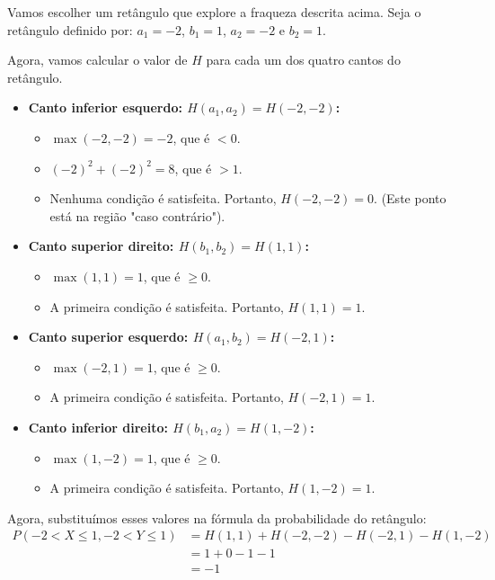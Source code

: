 \documentclass[12pt]{article}
\begin{document}
Vamos escolher um retângulo que explore a fraqueza descrita acima.
Seja o retângulo definido por: $a_1 = -2$, $b_1 = 1$, $a_2 = -2$ e $b_2 = 1$.

Agora, vamos calcular o valor de $H$ para cada um dos quatro cantos do retângulo.

\begin{itemize}
    \item \textbf{Canto inferior esquerdo: $H(a_1, a_2) = H(-2, -2)$:}
    \begin{itemize}
        \item $\max(-2,-2) = -2$, que é $< 0$.
        \item $(-2)^2 + (-2)^2 = 8$, que é $> 1$.
        \item Nenhuma condição é satisfeita. Portanto, \textbf{$H(-2, -2) = 0$}.
        (Este ponto está na região "caso contrário").
    \end{itemize}
    
    \item \textbf{Canto superior direito: $H(b_1, b_2) = H(1, 1)$:}
    \begin{itemize}
        \item $\max(1,1) = 1$, que é $\ge 0$.
        \item A primeira condição é satisfeita. Portanto, \textbf{$H(1, 1) = 1$}.
    \end{itemize}

    \item \textbf{Canto superior esquerdo: $H(a_1, b_2) = H(-2, 1)$:}
    \begin{itemize}
        \item $\max(-2,1) = 1$, que é $\ge 0$.
        \item A primeira condição é satisfeita. Portanto, \textbf{$H(-2, 1) = 1$}.
    \end{itemize}

    \item \textbf{Canto inferior direito: $H(b_1, a_2) = H(1, -2)$:}
    \begin{itemize}
        \item $\max(1,-2) = 1$, que é $\ge 0$.
        \item A primeira condição é satisfeita. Portanto, \textbf{$H(1, -2) = 1$}.
    \end{itemize}
\end{itemize}

Agora, substituímos esses valores na fórmula da probabilidade do retângulo:
\begin{align*}
P(-2 < X \le 1, -2 < Y \le 1) &= H(1, 1) + H(-2, -2) - H(-2, 1) - H(1, -2) \\
&= 1 + 0 - 1 - 1 \\
&= -1
\end{align*}
\end{document}
